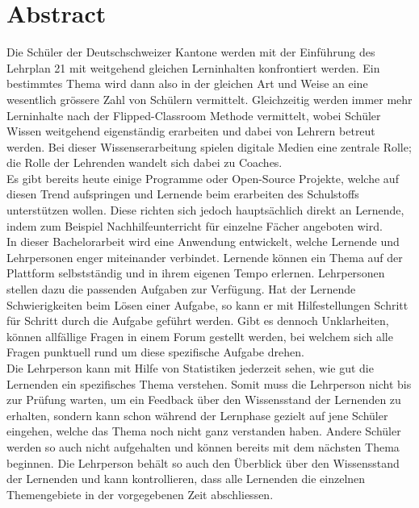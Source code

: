 \afterpage{\blankpage}
\section*{Abstract}

Die Schüler der Deutschschweizer Kantone werden mit der Einführung des Lehrplan 21 mit weitgehend gleichen Lerninhalten konfrontiert werden. Ein bestimmtes Thema wird dann also in der gleichen Art und Weise an eine wesentlich grössere Zahl von Schülern vermittelt. Gleichzeitig werden immer mehr Lerninhalte nach der Flipped-Classroom Methode vermittelt, wobei Schüler Wissen weitgehend eigenständig erarbeiten und dabei von Lehrern betreut werden. Bei dieser Wissenserarbeitung spielen digitale Medien eine zentrale Rolle; die Rolle der Lehrenden wandelt sich dabei zu Coaches. \\

Es gibt bereits heute einige Programme oder Open-Source Projekte, welche auf diesen Trend aufspringen und Lernende beim erarbeiten des Schulstoffs unterstützen wollen. Diese richten sich jedoch hauptsächlich direkt an Lernende, indem zum Beispiel Nachhilfeunterricht für einzelne Fächer angeboten wird. \\

In dieser Bachelorarbeit wird eine Anwendung entwickelt, welche Lernende und Lehrpersonen enger miteinander verbindet. Lernende können ein Thema auf der Plattform selbstständig und in ihrem eigenen Tempo erlernen. Lehrpersonen stellen dazu die passenden Aufgaben zur Verfügung. Hat der Lernende Schwierigkeiten beim Lösen einer Aufgabe, so kann er mit Hilfestellungen Schritt für Schritt durch die Aufgabe geführt werden. Gibt es dennoch Unklarheiten, können allfällige Fragen in einem Forum gestellt werden, bei welchem sich alle Fragen punktuell rund um diese spezifische Aufgabe drehen. \\

Die Lehrperson kann mit Hilfe von Statistiken jederzeit sehen, wie gut die Lernenden ein spezifisches Thema verstehen. Somit muss die Lehrperson nicht bis zur Prüfung warten, um ein Feedback über den Wissensstand der Lernenden zu erhalten, sondern kann schon während der Lernphase gezielt auf jene Schüler eingehen, welche das Thema noch nicht ganz verstanden haben. Andere Schüler werden so auch nicht aufgehalten und können bereits mit dem nächsten Thema beginnen. Die Lehrperson behält so auch den Überblick über den Wissensstand der Lernenden und kann kontrollieren, dass alle Lernenden die einzelnen Themengebiete in der vorgegebenen Zeit abschliessen.


\newpage